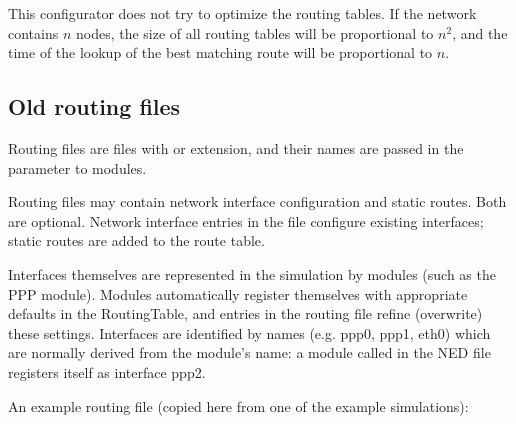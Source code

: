 \begin{note}
This configurator does not try to optimize the routing tables.
If the network contains $n$ nodes, the size of all routing tables
will be proportional to $n^2$, and the time of the lookup of the
best matching route will be proportional to $n$.
\end{note}



\subsection{Old routing files}
\label{subsec:routing_files}

Routing files are files with  or  extension,
and their names are passed in the  parameter
to  modules.

Routing files may contain network interface configuration and static
routes. Both are optional. Network interface entries in the file
configure existing interfaces; static routes are added to the route table.

Interfaces themselves are represented in the simulation by modules
(such as the PPP module). Modules automatically register themselves
with appropriate defaults in the RoutingTable, and entries in the
routing file refine (overwrite) these settings.
Interfaces are identified by names (e.g. ppp0, ppp1, eth0) which
are normally derived from the module's name: a module called
 in the NED file registers itself as interface ppp2.

An example routing file (copied here from one of the example simulations):

